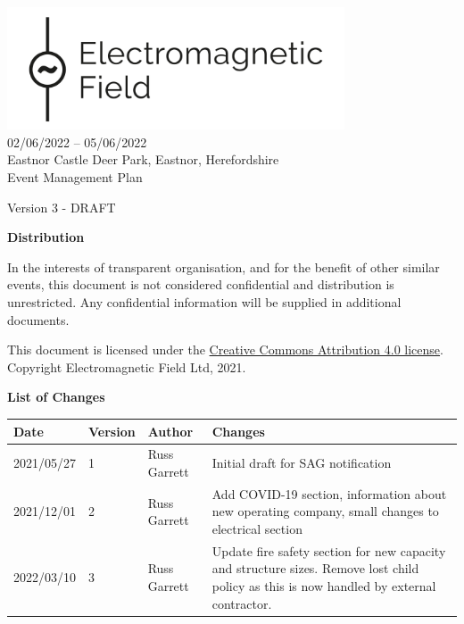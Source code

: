 

\newcommand{\st}{\textsuperscript{st} }
\newcommand{\nd}{\textsuperscript{nd} }
\renewcommand{\th}{\textsuperscript{th} }
\newcommand{\rd}{\textsuperscript{rd} }
\newcommand{\sq}{\textsuperscript{2}}




\begin{titlepage}
\thispagestyle{empty}
\begin{center}
    \includegraphics[width=10cm]{../resources/emf-logo.png}\\[24pt]
    {\LARGE 02/06/2022 -- 05/06/2022} \\[16pt]
    {\Large Eastnor Castle Deer Park, Eastnor, Herefordshire} \\[48pt]

    {\Large Event Management Plan}

    Version 3 - DRAFT

    \vfill

    \begin{framed}
        \textbf{Distribution}

        In the interests of transparent organisation, and for the benefit of other similar events,
        this document is not considered confidential and distribution is unrestricted.
        Any confidential information will be supplied in additional documents.
        
        \footnotesize{This document is licensed under the
        \href{https://creativecommons.org/licenses/by/4.0/}{Creative Commons Attribution 4.0 license}.
	Copyright Electromagnetic Field Ltd, 2021.}
    \end{framed}

    \textbf{List of Changes}
    \begin{tabular}{l | l | l | p{10cm}}
      Date & Version & Author & Changes \\
      \hline
      2021/05/27 & 1 & Russ Garrett & Initial draft for SAG notification \\
      2021/12/01 & 2 & Russ Garrett & Add COVID-19 section, information about new operating company, small changes to electrical section \\
      2022/03/10 & 3 & Russ Garrett & Update fire safety section for new capacity and structure sizes. Remove lost child policy as this
                                      is now handled by external contractor. \\
    \end{tabular}
\end{center}
\end{titlepage}
\setcounter{page}{2}

\tableofcontents

\newpage




